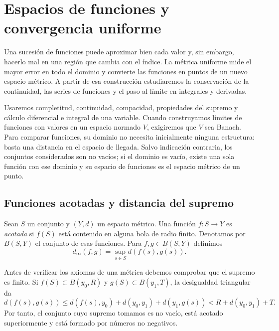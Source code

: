 \chapter{Espacios de funciones y convergencia uniforme}\label{cap:nuevo11}\label{chap:25}\label{chap:26}

Una sucesión de funciones puede aproximar bien cada valor y, sin embargo, hacerlo mal en una región que cambia con el índice. La métrica uniforme mide el mayor error en todo el dominio y convierte las funciones en puntos de un nuevo espacio métrico. A partir de esa construcción estudiaremos la conservación de la continuidad, las series de funciones y el paso al límite en integrales y derivadas.

Usaremos completitud, continuidad, compacidad, propiedades del supremo y cálculo diferencial e integral de una variable. Cuando construyamos límites de funciones con valores en un espacio normado $V$, exigiremos que $V$ sea Banach. Para comparar funciones, su dominio no necesita inicialmente ninguna estructura: basta una distancia en el espacio de llegada. Salvo indicación contraria, los conjuntos considerados son no vacíos; si el dominio es vacío, existe una sola función con ese dominio y su espacio de funciones es el espacio métrico de un punto.

\section{Funciones acotadas y distancia del supremo}
\label{lectura:25}
\begin{definicion}
Sean $S$ un conjunto y $(Y,d)$ un espacio métrico. Una función $f:S\to Y$ es \emph{acotada} si $f(S)$ está contenido en alguna bola de radio finito. Denotamos por $B(S,Y)$ el conjunto de esas funciones. Para $f,g\in B(S,Y)$ definimos
\[
 d_\infty(f,g)=\sup_{s\in S}d(f(s),g(s)).
\]
\end{definicion}

Antes de verificar los axiomas de una métrica debemos comprobar que el supremo es finito. Si $f(S)\subset B(y_0,R)$ y $g(S)\subset B(y_1,T)$, la desigualdad triangular da
\[
 d(f(s),g(s))\le d(f(s),y_0)+d(y_0,y_1)+d(y_1,g(s))
 <R+d(y_0,y_1)+T.
\]
Por tanto, el conjunto cuyo supremo tomamos es no vacío, está acotado superiormente y está formado por números no negativos.

